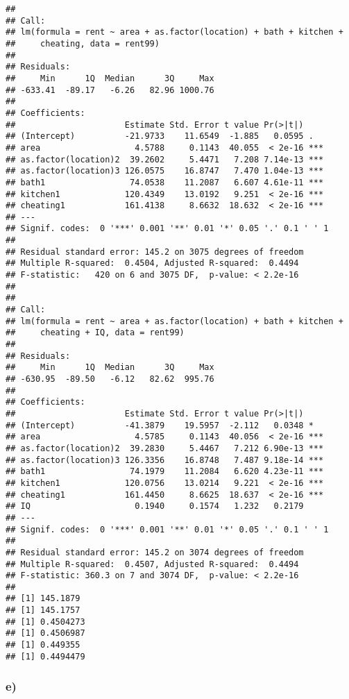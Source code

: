 \documentclass[]{article}
\begin{document}
\begin{verbatim}
## 
## Call:
## lm(formula = rent ~ area + as.factor(location) + bath + kitchen + 
##     cheating, data = rent99)
## 
## Residuals:
##     Min      1Q  Median      3Q     Max 
## -633.41  -89.17   -6.26   82.96 1000.76 
## 
## Coefficients:
##                      Estimate Std. Error t value Pr(>|t|)    
## (Intercept)          -21.9733    11.6549  -1.885   0.0595 .  
## area                   4.5788     0.1143  40.055  < 2e-16 ***
## as.factor(location)2  39.2602     5.4471   7.208 7.14e-13 ***
## as.factor(location)3 126.0575    16.8747   7.470 1.04e-13 ***
## bath1                 74.0538    11.2087   6.607 4.61e-11 ***
## kitchen1             120.4349    13.0192   9.251  < 2e-16 ***
## cheating1            161.4138     8.6632  18.632  < 2e-16 ***
## ---
## Signif. codes:  0 '***' 0.001 '**' 0.01 '*' 0.05 '.' 0.1 ' ' 1
## 
## Residual standard error: 145.2 on 3075 degrees of freedom
## Multiple R-squared:  0.4504, Adjusted R-squared:  0.4494 
## F-statistic:   420 on 6 and 3075 DF,  p-value: < 2.2e-16
## 
## 
## Call:
## lm(formula = rent ~ area + as.factor(location) + bath + kitchen + 
##     cheating + IQ, data = rent99)
## 
## Residuals:
##     Min      1Q  Median      3Q     Max 
## -630.95  -89.50   -6.12   82.62  995.76 
## 
## Coefficients:
##                      Estimate Std. Error t value Pr(>|t|)    
## (Intercept)          -41.3879    19.5957  -2.112   0.0348 *  
## area                   4.5785     0.1143  40.056  < 2e-16 ***
## as.factor(location)2  39.2830     5.4467   7.212 6.90e-13 ***
## as.factor(location)3 126.3356    16.8748   7.487 9.18e-14 ***
## bath1                 74.1979    11.2084   6.620 4.23e-11 ***
## kitchen1             120.0756    13.0214   9.221  < 2e-16 ***
## cheating1            161.4450     8.6625  18.637  < 2e-16 ***
## IQ                     0.1940     0.1574   1.232   0.2179    
## ---
## Signif. codes:  0 '***' 0.001 '**' 0.01 '*' 0.05 '.' 0.1 ' ' 1
## 
## Residual standard error: 145.2 on 3074 degrees of freedom
## Multiple R-squared:  0.4507, Adjusted R-squared:  0.4494 
## F-statistic: 360.3 on 7 and 3074 DF,  p-value: < 2.2e-16
## 
## [1] 145.1879
## [1] 145.1757
## [1] 0.4504273
## [1] 0.4506987
## [1] 0.449355
## [1] 0.4494479
\end{verbatim}

\subsubsection{e)}\label{e-1}
\end{document}
